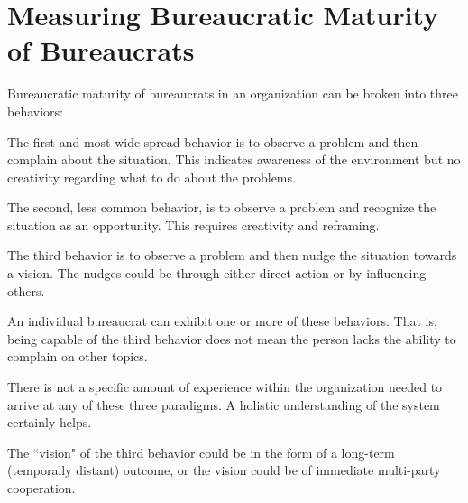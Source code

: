 \section{Measuring Bureaucratic Maturity of Bureaucrats}

Bureaucratic maturity of bureaucrats in an organization can be broken into three behaviors: 

The first and most wide spread behavior is to observe a problem and then complain about the situation. This indicates awareness of the environment but no creativity regarding what to do about the problems.

The second, less common behavior, is to observe a problem and recognize the situation as an opportunity. This requires creativity and reframing. 

The third behavior is to observe a problem and then nudge the situation towards a vision. The nudges could be through either direct action or by influencing others. 



An individual bureaucrat can exhibit one or more of these behaviors. That is, being capable of the third behavior does not mean the person lacks the ability to complain on other topics. 

There is not a specific amount of experience within the organization needed to arrive at any of these three paradigms. A holistic understanding of the system certainly helps.

The ``vision" of the third behavior could be in the form of a long-term (temporally distant) outcome, or the vision could be of immediate multi-party cooperation. 